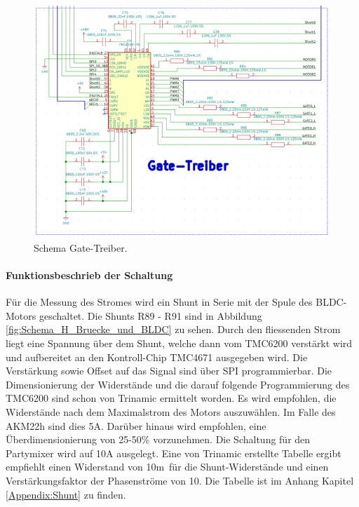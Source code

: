 \begin{figure}[H]
	\centering
	\includegraphics[width=\textwidth]{graphics/Schema_Gate_Treiber}
	\caption{Schema Gate-Treiber.}
	\label{fig:Schema_Gate_Treiber}
\end{figure}


\paragraph{Funktionsbeschrieb der Schaltung}\mbox{}

Für die Messung des Stromes wird ein Shunt in Serie mit der Spule des BLDC-Motors geschaltet. Die Shunts R89 - R91 sind in Abbildung \ref{fig:Schema_H_Bruecke_und_BLDC} zu sehen. Durch den fliessenden Strom liegt eine Spannung über dem Shunt, welche dann vom TMC6200 verstärkt wird und aufbereitet an den Kontroll-Chip TMC4671 ausgegeben wird. Die Verstärkung sowie Offset auf das Signal sind über SPI programmierbar.
Die Dimensionierung der Widerstände und die darauf folgende Programmierung des TMC6200 sind schon von Trinamic ermittelt worden. Es wird empfohlen, die Widerstände nach dem Maximalstrom des Motors auszuwählen. Im Falle des AKM22h sind dies 5A. Darüber hinaus wird empfohlen, eine Überdimensionierung von 25-50\% vorzunehmen. Die Schaltung für den Partymixer wird auf 10A ausgelegt. Eine von Trinamic erstellte Tabelle  ergibt empfiehlt einen Widerstand von 10m\textOmega\ für die Shunt-Widerstände und einen Verstärkungsfaktor der Phasenströme von 10. Die Tabelle ist im Anhang Kapitel \ref{Appendix:Shunt} zu finden. \cite[S.31]{trinamicmotion_control_gmbh__co_kg_tmc6200_2019}

